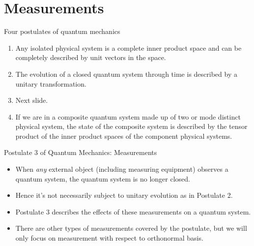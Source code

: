 \documentclass[handout, 10 pt]{beamer}
\begin{document}
\section{Measurements}
\begin{comment}
Note the following description is not mathematically rigorous.
\end{comment}

\begin{frame}{Four postulates of quantum mechanics}
    \begin{enumerate}
        \item Any isolated physical system is a complete inner product space and can be completely described by unit vectors in the space.
        \pause
        \item The evolution of a closed quantum system through time is described by a unitary transformation.
        \pause
        \item Next slide.
        \pause
        \item If we are in a composite quantum system made up of two or mode distinct physical system, the state of the composite system is described by the tensor product of the inner product spaces of the component physical systems. 
    \end{enumerate}
\end{frame}

\begin{comment}
Recall Schrodinger's cat.
\end{comment}
\begin{frame}{Postulate 3 of Quantum Mechanics: Measurements}
\begin{itemize}
    \item When {\emph{any}} external object (including measuring equipment) observes a quantum system, the quantum system is no longer closed.
    \pause
    \item Hence it's not necessarily subject to unitary evolution as in Postulate 2. 
    \pause
    \item Postulate 3 describes the effects of these measurements on a quantum system.
    \pause
    \item There are other types of measurements covered by the postulate, but we will only focus on measurement with respect to orthonormal basis.
\end{itemize}

\end{frame}
\end{document}
